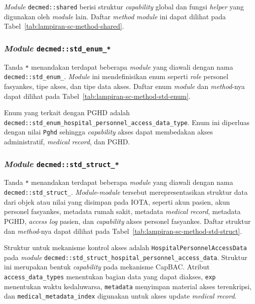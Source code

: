\textit{Module} \texttt{decmed::shared} berisi struktur \textit{capability} global dan fungsi \textit{helper} yang digunakan oleh \textit{module} lain. 
Daftar \textit{method} \textit{module} ini dapat dilihat pada Tabel~\ref{tab:lampiran-sc-method-shared}. 

\subsubsection{\textit{Module} \texttt{decmed::std\_enum\_*}}\label{subsubsec:sc-module-std-enum}

Tanda \texttt{*} menandakan terdapat beberapa \textit{module} yang diawali dengan nama \texttt{decmed::std\_enum\_}. 
\textit{Module} ini mendefinisikan enum seperti \textit{role} personel fasyankes, tipe akses, dan tipe data akses. 
Daftar enum \textit{module} dan \textit{method}-nya dapat dilihat pada Tabel~\ref{tab:lampiran-sc-method-std-enum}.

Enum yang terkait dengan PGHD adalah \texttt{decmed::\allowbreak{}std\_\allowbreak{}enum\_\allowbreak{}hospital\_\allowbreak{}personnel\_\allowbreak{}access\_\allowbreak{}data\_\allowbreak{}type}. 
Enum ini diperluas dengan nilai \texttt{Pghd} sehingga \textit{capability} akses dapat membedakan akses administratif, \textit{medical record}, dan PGHD\@.

\subsubsection{\textit{Module} \texttt{decmed::std\_struct\_*}}\label{subsubsec:sc-module-std-struct}

Tanda \texttt{*} menandakan terdapat beberapa \textit{module} yang diawali dengan nama \texttt{decmed::std\_struct\_}. 
\textit{Module}-\textit{module} tersebut merepresentasikan struktur data dari objek atau nilai yang disimpan pada IOTA, seperti akun pasien, akun personel fasyankes, metadata rumah sakit, metadata \textit{medical record}, metadata PGHD, \textit{access log} pasien, dan \textit{capability} akses personel fasyankes. 
Daftar struktur dan \textit{method}-nya dapat dilihat pada Tabel~\ref{tab:lampiran-sc-method-std-struct}.

Struktur untuk mekanisme kontrol akses adalah \texttt{HospitalPersonnelAccessData} pada \textit{module} \texttt{decmed::std\_struct\_hospital\_personnel\_access\_data}. 
Struktur ini merupakan bentuk \textit{capability} pada mekanisme CapBAC\@. 
Atribut \texttt{access\_data\_types} menentukan bagian data yang dapat diakses, \texttt{exp} menentukan waktu kedaluwarsa, \texttt{metadata} menyimpan material akses terenkripsi, dan \texttt{medical\_metadata\_index} digunakan untuk akses update \textit{medical record}.

